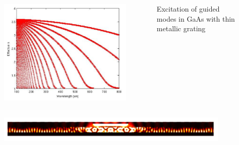 \documentclass{beamer}
\begin{document}
\begin{frame}
	\begin{columns}

		\begin{column}{0.5\textwidth}
			\begin{figure}[htb]
				\includegraphics[width=\textwidth]{../images/antenaThz/gaas_mod_structure.png}\\
			\end{figure}
		\end{column}
		\begin{column}{0.5\textwidth}
			Excitation of guided modes in GaAs with thin metallic grating
			{\tiny \cite{Stolarek2011}}
		\end{column}
	\end{columns}
	\begin{figure}[htb]
		\includegraphics[width=\textwidth]{../images/antenaThz/final_stru.png}\\
	\end{figure}
	{\tiny \cite{Szczytko2012271}}
\end{frame}
\end{document}
